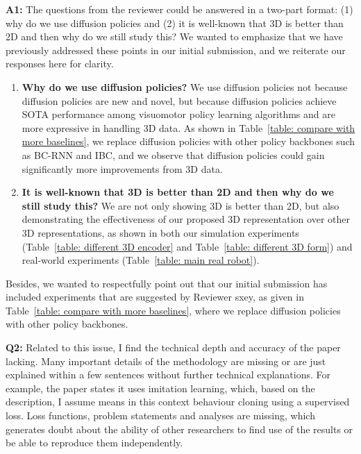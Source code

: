 \noindent\textbf{A1:} The questions from the reviewer could be answered in a two-part format: (1) why do we use diffusion policies and (2) it is well-known that 3D is better than 2D and then why do we still study this? We wanted to emphasize that we have previously addressed these points in our initial submission, and we reiterate our responses here for clarity.
\begin{enumerate}
    \item \textbf{Why do we use diffusion policies?} We use diffusion policies not because diffusion policies are new and novel, but because diffusion policies achieve SOTA performance among visuomotor policy learning algorithms and are more expressive in handling 3D data. As shown in Table~\ref{table: compare with more baselines}, we replace diffusion policies with other policy backbones such as BC-RNN and IBC, and we observe that diffusion policies could gain significantly more improvements from 3D data. 
    \item \textbf{It is well-known that 3D is better than 2D and then why do we still study this?} We are not only showing 3D is better than 2D, but also demonstrating the effectiveness of our proposed 3D representation over other 3D representations, as shown in both our simulation experiments (Table~\ref{table: different 3D encoder} and  Table~\ref{table: different 3D form}) and real-world experiments (Table~\ref{table: main real robot}).
\end{enumerate}
Besides, we wanted to respectfully point out that our initial submission has included experiments that are suggested by Reviewer sxey, as given in Table~\ref{table: compare with more baselines}, where we replace diffusion policies with other policy backbones.




\vspace{0.1in}

\noindent\textbf{Q2:} Related to this issue, I find the technical depth and accuracy of the paper lacking. Many important details of the methodology are missing or are just explained within a few sentences without further technical explanations. For example, the paper states it uses imitation learning, which, based on the description, I assume means in this context behaviour cloning using a supervised loss. Loss functions, problem statements and analyses are missing, which generates doubt about the ability of other researchers to find use of the results or be able to reproduce them independently.

